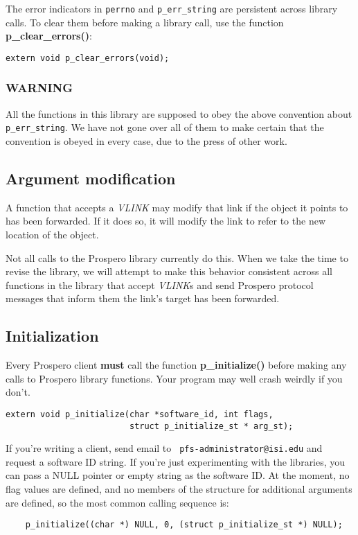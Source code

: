 The error indicators in {\tt perrno} and {\tt p\_err\_string} are
persistent across library calls.  To clear them before making a
library call, use the function {\bf p\_clear\_errors()}:
\begin{verbatim}
extern void p_clear_errors(void);
\end{verbatim}

\subsubsection{WARNING}

All the functions in this library are supposed to obey the above
convention about {\tt p\_err\_string}.  We have not gone over all of
them to make certain that the convention is obeyed in every case, due
to the press of other work.

\subsection{Argument modification}

A function that accepts a {\it VLINK} may modify that link if the
object it points to has been forwarded.  If it does so, it will modify
the link to refer to the new location of the object.

Not all calls to the Prospero library currently do this.  When we take
the time to revise the library, we will attempt to make this behavior
consistent across all functions in the library that accept {\it VLINK}s
and send Prospero protocol messages that inform them the link's target
has been forwarded.

\subsection{Initialization}

Every Prospero client {\bf must} call the function 
{\bf p\_initialize()} before making any calls to Prospero library
functions.  Your program may well crash weirdly if you don't.


\begin{verbatim}
extern void p_initialize(char *software_id, int flags, 
                         struct p_initialize_st * arg_st);
\end{verbatim}

If you're writing a client, send email to {\tt
pfs-administrator@isi.edu} and request a software ID string.  If
you're just experimenting with the libraries, you can pass a NULL
pointer or empty string  as the software ID.  
At the moment, no flag values are defined, and no members of the
structure for additional arguments are defined, so the most common
calling sequence is:
\begin{verbatim}
	p_initialize((char *) NULL, 0, (struct p_initialize_st *) NULL);
\end{verbatim}

